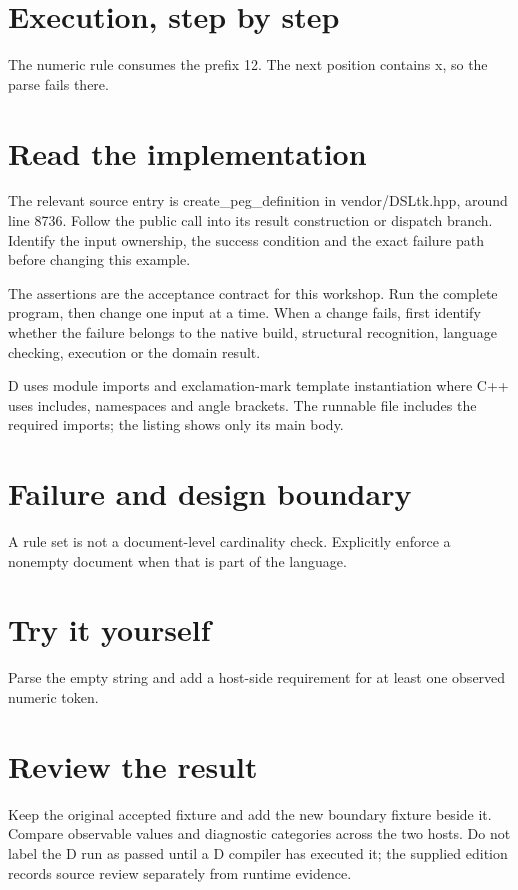 
\section*{Execution, step by step}
The numeric rule consumes the prefix 12. The next position contains x, so the parse fails there.

\section*{Read the implementation}
The relevant source entry is create\_peg\_definition in vendor/DSLtk.hpp, around line 8736. Follow the public call into its result construction or dispatch branch. Identify the input ownership, the success condition and the exact failure path before changing this example.

The assertions are the acceptance contract for this workshop. Run the complete program, then change one input at a time. When a change fails, first identify whether the failure belongs to the native build, structural recognition, language checking, execution or the domain result.

\clearpage
{}
D uses module imports and exclamation-mark template instantiation where C++ uses includes, namespaces and angle brackets. The runnable file includes the required imports; the listing shows only its main body.


\section*{Failure and design boundary}
A rule set is not a document-level cardinality check. Explicitly enforce a nonempty document when that is part of the language.

\section*{Try it yourself}
Parse the empty string and add a host-side requirement for at least one observed numeric token.

\section*{Review the result}
Keep the original accepted fixture and add the new boundary fixture beside it. Compare observable values and diagnostic categories across the two hosts. Do not label the D run as passed until a D compiler has executed it; the supplied edition records source review separately from runtime evidence.

